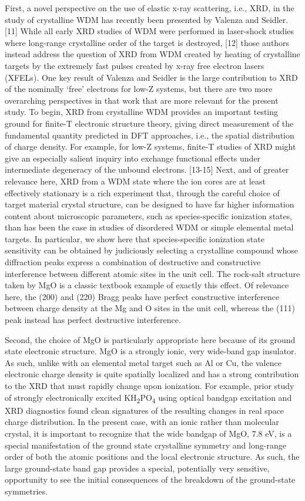 First, a novel perspective on the use of elastic x-ray scattering, i.e.,
XRD, in the study of crystalline WDM has recently been presented by
Valenza and Seidler. {[}11{]} While all early XRD studies of WDM were
performed in laser-shock studies where long-range crystalline order of
the target is destroyed, {[}12{]} those authors instead address the
question of XRD from WDM created by heating of crystalline targets by
the extremely fast pulses created by x-ray free electron lasers (XFELs).
One key result of Valenza and Seidler is the large contribution to XRD
of the nominally `free' electrons for low-Z systems, but there are two
more overarching perspectives in that work that are more relevant for
the present study. To begin, XRD from crystalline WDM provides an
important testing ground for finite-T electronic structure theory,
giving direct measurement of the fundamental quantity predicted in DFT
approaches, i.e., the spatial distribution of charge density. For
example, for low-Z systems, finite-T studies of XRD might give an
especially salient inquiry into exchange functional effects under
intermediate degeneracy of the unbound electrons. {[}13-15{]} Next, and
of greater relevance here, XRD from a WDM state where the ion cores are
at least effectively stationary is a rich experiment that, through the
careful choice of target material crystal structure, can be designed to
have far higher information content about microscopic parameters, such
as species-specific ionization states, than has been the case in studies
of disordered WDM or simple elemental metal targets. In particular, we
show here that species-specific ionization state sensitivity can be
obtained by judiciously selecting a crystalline compound whose
diffraction peaks express a combination of destructive and constructive
interference between different atomic sites in the unit cell. The
rock-salt structure taken by MgO is a classic textbook example of
exactly this effect. Of relevance here, the (200) and (220) Bragg peaks
have perfect constructive interference between charge density at the Mg
and O sites in the unit cell, whereas the (111) peak instead has perfect
destructive interference.

Second, the choice of MgO is particularly appropriate here because of
its ground state electronic structure. MgO is a strongly ionic, very
wide-band gap insulator. As such, unlike with an elemental metal target
such as Al or Cu, the valence electronic charge density is quite
spatially localized and has a strong contribution to the XRD that must
rapidly change upon ionization. For example, prior study of strongly
electronically excited KH\textsubscript{2}PO\textsubscript{4} using
optical bandgap excitation and XRD diagnostics found clean signatures of
the resulting changes in real space charge distribution. In the present
case, with an ionic rather than molecular crystal, it is important to
recognize that the wide bandgap of MgO, 7.8 eV, is a special
manifestation of the ground state crystalline symmetry and long-range
order of both the atomic positions and the local electronic structure.
As such, the large ground-state band gap provides a special, potentially
very sensitive, opportunity to see the initial consequences of the
breakdown of the ground-state symmetries.

